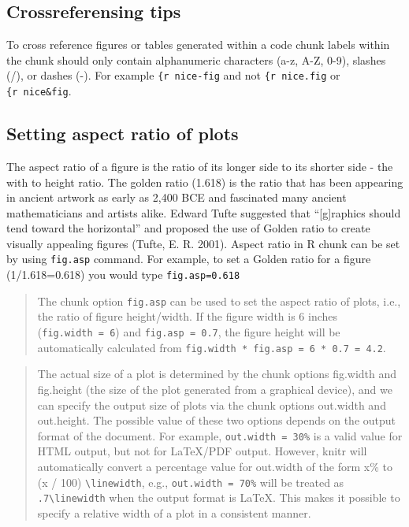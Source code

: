 \documentclass[]{book}
\begin{document}
\subsection{Crossreferensing tips}\label{crossreferensing-tips}

To cross reference figures or tables generated within a code chunk
labels within the chunk should only contain alphanumeric characters
(a-z, A-Z, 0-9), slashes (/), or dashes (-). For example
\texttt{\{r\ nice-fig} and not \texttt{\{r\ nice.fig} or
\texttt{\{r\ nice\&fig}.

\subsection{Setting aspect ratio of
plots}\label{setting-aspect-ratio-of-plots}

The aspect ratio of a figure is the ratio of its longer side to its
shorter side - the with to height ratio. The golden ratio (1.618) is the
ratio that has been appearing in ancient artwork as early as 2,400 BCE
and fascinated many ancient mathematicians and artists alike. Edward
Tufte suggested that ``{[}g{]}raphics should tend toward the
horizontal'' and proposed the use of Golden ratio to create visually
appealing figures (Tufte, E. R. 2001). Aspect ratio in R chunk can be
set by using \texttt{fig.asp} command. For example, to set a Golden
ratio for a figure (1/1.618=0.618) you would type \texttt{fig.asp=0.618}

\begin{quote}
The chunk option \texttt{fig.asp} can be used to set the aspect ratio of
plots, i.e., the ratio of figure height/width. If the figure width is 6
inches (\texttt{fig.width\ =\ 6}) and \texttt{fig.asp\ =\ 0.7}, the
figure height will be automatically calculated from
\texttt{fig.width\ *\ fig.asp\ =\ 6\ *\ 0.7\ =\ 4.2}.
\end{quote}

\begin{quote}
The actual size of a plot is determined by the chunk options fig.width
and fig.height (the size of the plot generated from a graphical device),
and we can specify the output size of plots via the chunk options
out.width and out.height. The possible value of these two options
depends on the output format of the document. For example,
\texttt{out.width\ =\ \textquotesingle{}30\%\textquotesingle{}} is a
valid value for HTML output, but not for LaTeX/PDF output. However,
knitr will automatically convert a percentage value for out.width of the
form x\% to (x / 100) \texttt{\textbackslash{}linewidth}, e.g.,
\texttt{out.width\ =\ \textquotesingle{}70\%\textquotesingle{}} will be
treated as \texttt{.7\textbackslash{}linewidth} when the output format
is LaTeX. This makes it possible to specify a relative width of a plot
in a consistent manner.
\end{quote}
\end{document}
